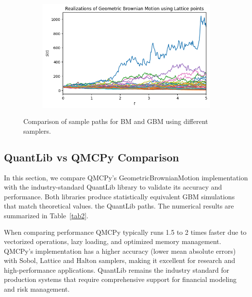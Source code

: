 \begin{figure}[H]
\begin{subfigure}[b]{0.49\textwidth}
\caption{}
\label{fig:bm_lattice}
\end{subfigure}
\hfill
\begin{subfigure}[b]{0.49\textwidth}
\includegraphics[width=\textwidth]{GBM/images/figure_4.png}
\caption{}
\label{fig:gbm_lattice}
\end{subfigure}
\caption{Comparison of sample paths for BM and GBM using different samplers.}
\label{fig:bm_gbm_paths}
\end{figure}

\subsection{QuantLib vs QMCPy Comparison}

In this section, we compare QMCPy's GeometricBrownianMotion implementation with
the industry-standard QuantLib library \cite{quantlib} to validate its accuracy
and performance. Both libraries produce statistically equivalent GBM simulations
that match theoretical values.  %
the QuantLib paths.
The numerical results are summarized in Table~\ref{tab2}. 

When comparing performance QMCPy typically runs 1.5 to 2 times faster due to
vectorized operations, lazy loading, and optimized memory management. QMCPy's
implementation has a higher accuracy (lower mean absolute errors) with Sobol,
Lattice and Halton samplers, making it excellent for research and
high-performance applications. QuantLib remains the industry standard for
production systems that require comprehensive support for financial modeling and
risk management.




